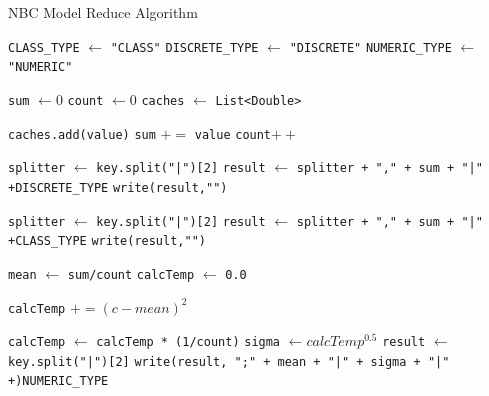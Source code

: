 \begin{enumerate}
	
\begin{algorithm}[H]
\caption{NBC Model Reduce Algorithm}\label{alg:NBCGenReduce}
\begin{algorithmic}[1]

\State \verb|CLASS_TYPE| $\gets$ \texttt{"CLASS"}
\State \verb|DISCRETE_TYPE| $\gets$ \texttt{"DISCRETE"}
\State \verb|NUMERIC_TYPE| $\gets$ \texttt{"NUMERIC"}

\State \texttt{sum} $\gets 0$
\State \texttt{count} $\gets 0$
\State \texttt{caches} $\gets$ \texttt{List<Double>}

	\State \texttt{caches.add(value)}
	\State \texttt{sum} $+=$ \texttt{value}
	\State \texttt{count}$++$
\EndFor


\State \texttt{splitter} $\gets$ \texttt{key.split("|")[2]}
\State \texttt{result} $\gets$ \texttt{splitter + "," + sum + "|" +}\verb|DISCRETE_TYPE|
\State \texttt{write(result,"")}


\State \texttt{splitter} $\gets$ \texttt{key.split("|")[2]}
\State \texttt{result} $\gets$ \texttt{splitter + "," + sum + "|" +}\verb|CLASS_TYPE|
\State \texttt{write(result,"")}


\State \texttt{mean} $\gets$ \texttt{sum/count}
\State \texttt{calcTemp} $\gets$ \texttt{0.0}

	\State \texttt{calcTemp} $+= (c - mean)^2$
\EndFor

\State \texttt{calcTemp} $\gets$ \texttt{calcTemp * (1/count)}
\State \texttt{sigma} $\gets calcTemp^{0.5}$
\State \texttt{result} $\gets$  \texttt{key.split("|")[2]}
\State \texttt{write(result, ";" + mean + "|" + sigma + "|" +)}\verb|NUMERIC_TYPE|

\EndIf

\EndProcedure
\end{algorithmic}
\end{algorithm}
	
\end{enumerate}

